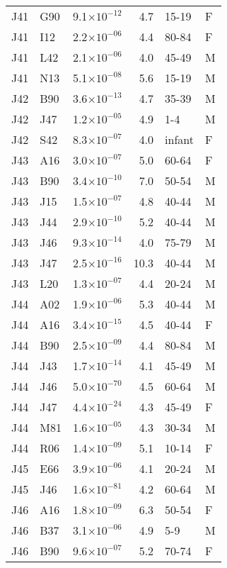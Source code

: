 \begin{longtable}{lllrll}
   J41 & G90 & 9.1$\times10^{-12}$ & 4.7 & 15-19 & F \\ 
   J41 & I12 & 2.2$\times10^{-06}$ & 4.4 & 80-84 & F \\ 
   J41 & L42 & 2.1$\times10^{-06}$ & 4.0 & 45-49 & M \\ 
   J41 & N13 & 5.1$\times10^{-08}$ & 5.6 & 15-19 & M \\ 
   J42 & B90 & 3.6$\times10^{-13}$ & 4.7 & 35-39 & M \\ 
   J42 & J47 & 1.2$\times10^{-05}$ & 4.9 & 1-4 & M \\ 
   J42 & S42 & 8.3$\times10^{-07}$ & 4.0 & infant & F \\ 
   J43 & A16 & 3.0$\times10^{-07}$ & 5.0 & 60-64 & F \\ 
   J43 & B90 & 3.4$\times10^{-10}$ & 7.0 & 50-54 & M \\ 
   J43 & J15 & 1.5$\times10^{-07}$ & 4.8 & 40-44 & M \\ 
   J43 & J44 & 2.9$\times10^{-10}$ & 5.2 & 40-44 & M \\ 
   J43 & J46 & 9.3$\times10^{-14}$ & 4.0 & 75-79 & M \\ 
   J43 & J47 & 2.5$\times10^{-16}$ & 10.3 & 40-44 & M \\ 
   J43 & L20 & 1.3$\times10^{-07}$ & 4.4 & 20-24 & M \\ 
   J44 & A02 & 1.9$\times10^{-06}$ & 5.3 & 40-44 & M \\ 
   J44 & A16 & 3.4$\times10^{-15}$ & 4.5 & 40-44 & F \\ 
   J44 & B90 & 2.5$\times10^{-09}$ & 4.4 & 80-84 & M \\ 
   J44 & J43 & 1.7$\times10^{-14}$ & 4.1 & 45-49 & M \\ 
   J44 & J46 & 5.0$\times10^{-70}$ & 4.5 & 60-64 & M \\ 
   J44 & J47 & 4.4$\times10^{-24}$ & 4.3 & 45-49 & F \\ 
   J44 & M81 & 1.6$\times10^{-05}$ & 4.3 & 30-34 & M \\ 
   J44 & R06 & 1.4$\times10^{-09}$ & 5.1 & 10-14 & F \\ 
   J45 & E66 & 3.9$\times10^{-06}$ & 4.1 & 20-24 & M \\ 
   J45 & J46 & 1.6$\times10^{-81}$ & 4.2 & 60-64 & M \\ 
   J46 & A16 & 1.8$\times10^{-09}$ & 6.3 & 50-54 & F \\ 
   J46 & B37 & 3.1$\times10^{-06}$ & 4.9 & 5-9 & M \\ 
   J46 & B90 & 9.6$\times10^{-07}$ & 5.2 & 70-74 & F \\ 

\end{longtable}
